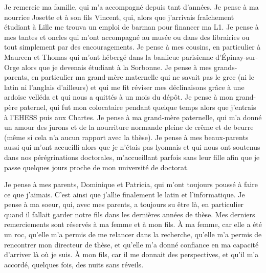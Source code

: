 Je remercie ma famille, qui m'a accompagné depuis tant d'années. Je pense à ma nourrice Josette et à son fils Vincent, qui, alors que j'arrivais fraîchement étudiant à Lille me trouva un emploi de barman pour financer ma L1. Je pense à mes tantes et oncles qui m'ont accompagné au musée ou dans des librairies ou tout simplement par des encouragements. Je pense à mes cousins, en particulier à Maureen et Thomas qui m'ont hébergé dans la banlieue parisienne d'Épinay-sur-Orge alors que je devenais étudiant à la Sorbonne. Je pense à mes grands-parents, en particulier ma grand-mère maternelle qui ne savait pas le grec (ni le latin ni l'anglais d'ailleurs) et qui me fit réviser mes déclinaisons grâce à une ardoise velléda et qui nous a quittés à un mois du dépôt. Je pense à mon grand-père paternel, qui fut mon colocataire pendant quelque temps alors que j'entrais à l'EHESS puis aux Chartes. Je pense à ma grand-mère paternelle, qui m'a donné un amour des jurons et de la nourriture normande pleine de crême et de beurre (même si cela n'a aucun rapport avec la thèse). Je pense à mes beaux-parents aussi qui m'ont accueilli alors que je n'étais pas lyonnais et qui nous ont soutenus dans nos pérégrinations doctorales, m'accueillant parfois sans leur fille afin que je passe quelques jours proche de mon université de doctorat.

Je pense à mes parents, Dominique et Patricia, qui m'ont toujours poussé à faire ce que j'aimais. C'est ainsi que j'allie finalement le latin et l'informatique. Je pense à ma soeur, qui, avec mes parents, a toujours su être là, en particulier quand il fallait garder notre fils dans les dernières années de thèse. Mes derniers remerciements sont réservés à ma femme et à mon fils. À ma femme, car elle a été un roc, qu'elle m'a permis de me relancer dans la recherche, qu'elle m'a permis de rencontrer mon directeur de thèse, et qu'elle m'a donné confiance en ma capacité d'arriver là où je suis. À mon fils, car il me donnait des perspectives, et qu'il m'a accordé, quelques fois, des nuits sans réveils.